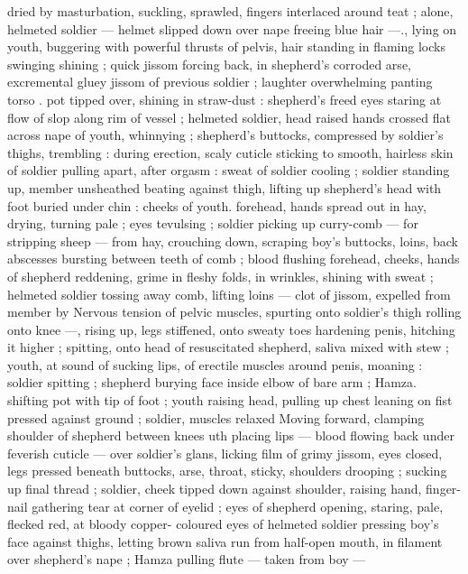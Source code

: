dried by masturbation, suckling, sprawled, fingers interlaced around 
teat ; alone, helmeted soldier --- helmet slipped down over nape 
freeing blue hair ---., lying on youth, buggering with powerful thrusts 
of pelvis, hair standing in flaming locks swinging shining ; quick 
jissom forcing back, in shepherd's corroded arse, excremental gluey 
jissom of previous soldier ; laughter overwhelming panting torso . 
pot tipped over, shining in straw-dust : shepherd's freed eyes staring 
at flow of slop along rim of vessel ; helmeted soldier, head raised 
hands crossed flat across nape of youth, whinnying ; shepherd's 
buttocks, compressed by soldier's thighs, trembling : during 
erection, scaly cuticle sticking to smooth, hairless skin of soldier 
pulling apart, after orgasm : sweat of soldier cooling ; soldier 
standing up, member unsheathed beating against thigh, lifting up 
shepherd's head with foot buried under chin : cheeks of youth. 
forehead, hands spread out in hay, drying, turning pale ; eyes 
tevulsing ; soldier picking up curry-comb --- for stripping sheep --- 
from hay, crouching down, scraping boy's buttocks, loins, back 
abscesses bursting between teeth of comb ; blood flushing 
forehead, cheeks, hands of shepherd reddening, grime in fleshy 
folds, in wrinkles, shining with sweat ; helmeted soldier tossing away 
comb, lifting loins --- clot of jissom, expelled from member by 
Nervous tension of pelvic muscles, spurting onto soldier's thigh 
rolling onto knee ---, rising up, legs stiffened, onto sweaty toes 
hardening penis, hitching it higher ; spitting, onto head of 
resuscitated shepherd, saliva mixed with stew ; youth, at sound of 
sucking lips, of erectile muscles around penis, moaning : soldier 
spitting ; shepherd burying face inside elbow of bare arm ; Hamza. 
shifting pot with tip of foot ; youth raising head, pulling up chest 
leaning on fist pressed against ground ; soldier, muscles relaxed 
Moving forward, clamping shoulder of shepherd between knees 
uth placing lips --- blood flowing back under feverish cuticle --- 
over soldier's glans, licking film of grimy jissom, eyes closed, legs 
pressed beneath buttocks, arse, throat, sticky, shoulders drooping ; 
sucking up final thread ; soldier, cheek tipped down against shoulder, 
raising hand, finger-nail gathering tear at corner of eyelid ; eyes of 
shepherd opening, staring, pale, flecked red, at bloody copper- 
coloured eyes of helmeted soldier pressing boy's face against 
thighs, letting brown saliva run from half-open mouth, in filament 
over shepherd's nape ; Hamza pulling flute --- taken from boy --- 
